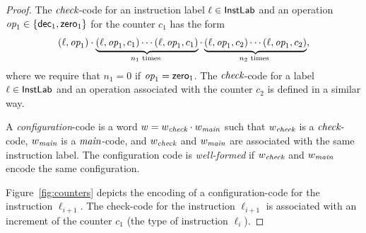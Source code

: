\begin{proof}
The ${\textit{check}}$-code  for an instruction label $\ell\in \mathsf{InstLab}$ and an operation ${\textit{op}}_1\in\{{\mathsf{dec}}_1,{\mathsf{zero}}_1\}$ for the counter $c_1$ has 
the form
\[
 (\ell,{\textit{op}}_1) \cdot   \underbrace{(\ell,{\textit{op}}_1,c_1)\cdots(\ell,{\textit{op}}_1,c_1)}_{n_1 \text{ times }}
 \cdot \underbrace{(\ell,{\textit{op}}_1,c_2)\cdots(\ell,{\textit{op}}_1,c_2)}_{n_2 \text{ times }},
\]
%
where we require that $n_1=0$ if ${\textit{op}}_1={\mathsf{zero}}_1$.  The ${\textit{check}}$-code  for a label $\ell\in \mathsf{InstLab}$ and an operation associated with the counter $c_2$
is defined in a similar way.

A \emph{configuration}-code is a word $w= w_{{\textit{check}}}\cdot w_{\textit{main}} $ such that  $w_{{\textit{check}}}$ is a ${\textit{check}}$-code, $w_{\textit{main}}$ is
a ${\textit{main}}$-code, and  $w_{{\textit{check}}}$ and $w_{\textit{main}}$ are associated with the same instruction label.
The configuration code is \emph{well-formed} if $ w_{{\textit{check}}}$ and $w_{\textit{main}} $ encode the same configuration.

Figure~\ref{fig:counters} depicts the encoding of a configuration-code for the instruction $\ell_{i+1}$. The check-code for the instruction $\ell_{i+1}$ is associated with an increment of the counter $c_1$ (the type of instruction $\ell_{i}$).


\end{proof}
